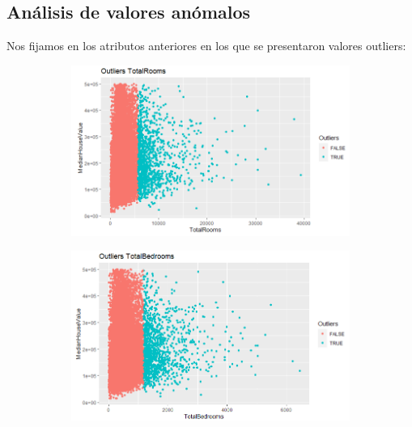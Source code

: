 \newpage
\subsection{Análisis de valores anómalos}
Nos fijamos en los atributos anteriores en los que se presentaron valores outliers:

\begin{figure}[!tbh]
	\centering
	\begin{subfigure}{0.5\textwidth}
		\includegraphics[width=1\linewidth]{figures/out_1}
		\caption{}
		\label{fig:out1}
	\end{subfigure}\hfil %
	\begin{subfigure}{0.5\textwidth}
		\includegraphics[width=1\linewidth]{figures/out_2}
		\caption{}
		\label{fig:out2}
	\end{subfigure}\hfil %
	
	\medskip
	

\end{figure}

